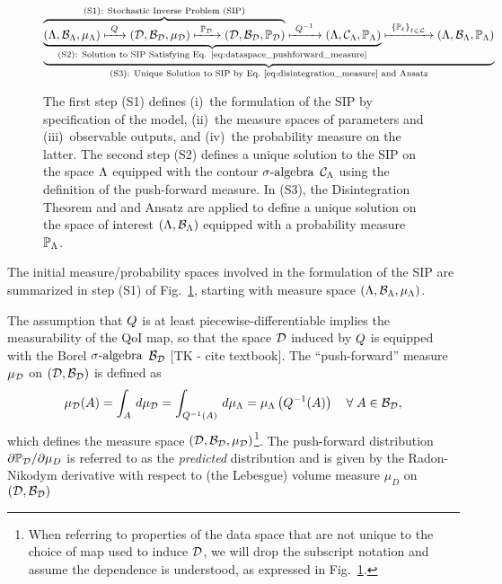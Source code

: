 \begin{figure}[!h]
\begin{equation}
\underbrace{
\underbrace{
\overbrace{ 
 ({\Lambda}, \mathcal{B}_{{\Lambda}}, \mu_{{\Lambda}}) \xmapsto{\  Q \ } (\mathcal{D}, \mathcal{B}_{\mathcal{D}}, \mu_{\mathcal{D}})
  \xmapsto{\ \mathbb{P}_{\mathcal{D}}\ } (\mathcal{D}, \mathcal{B}_{\mathcal{D}}, \mathbb{P}_{\mathcal{D}})
 }^{
 \text{(S1): Stochastic Inverse Problem (SIP)}
 }
 \xmapsto{\ Q^{-1} \ } ({\Lambda}, \mathcal{C}_{\Lambda}, \mathbb{P}_{\Lambda})
 }_{
 \text{(S2): Solution to SIP Satisfying Eq. \eqref{eq:dataspace_pushforward_measure}}} 
 \xmapsto{\ \left\{\mathbb{P}_\ell\right\}_{\ell\in\mathcal{L}} \ } ({\Lambda}, \mathcal{B}_{{\Lambda}}, \mathbb{P}_{\Lambda})
 }
 _{
 \text{(S3): Unique Solution to SIP by Eq.~\eqref{eq:disintegration_measure} and Ansatz}
 }
\end{equation}
\caption{The first step (S1) defines (i)~the formulation of the SIP by specification of the model, (ii)~the measure spaces of parameters and (iii)~observable outputs, and (iv)~the probability measure on the latter. The second step (S2) defines a unique solution to the SIP on the space ${\Lambda}$ equipped with the contour $\sigma\text{-algebra}$ $\mathcal{C}_{\Lambda}$ using the definition of the push-forward measure. In (S3), the Disintegration Theorem and and Ansatz are applied to define a unique solution on the space of interest $({\Lambda}, \mathcal{B}_{{\Lambda}})$ equipped with a probability measure $\mathbb{P}_{\Lambda}$.}
\label{fig:scheme}
\end{figure}


The initial measure/probability spaces involved in the formulation of the SIP are summarized in step (S1) of Fig.~\ref{fig:scheme}, starting with measure space $({\Lambda}, \mathcal{B}_{{\Lambda}}, \mu_{{\Lambda}})$.

The assumption that $Q$ is at least piecewise-differentiable implies the measurability of the QoI map, so that the space $\mathcal{D}$ induced by $Q$ is equipped with the Borel $\sigma\text{-algebra}$ $\mathcal{B}_{\mathcal{D}}$ [TK - cite textbook].
The ``push-forward'' measure $\mu_{\mathcal{D}}$ on ${(\mathcal{D}, \mathcal{B}_{\mathcal{D}})}$ is defined as 
\begin{equation}\label{eq:dataspace_pushforward_measure}
\mu_{\mathcal{D}} (A) = \int_A \, d\mu_{\mathcal{D}} = \int_{Q^{-1}(A)} \, d\mu_{{\Lambda}} = \mu_{{\Lambda}} \left (Q^{-1}(A) \right ) \quad \forall \;  A\in\mathcal{B}_{\mathcal{D}},
\end{equation}
which defines the measure space $(\mathcal{D}, \mathcal{B}_{\mathcal{D}}, \mu_{\mathcal{D}})$\footnote{When referring to properties of the data space that are not unique to the choice of map used to induce $\mathcal{D}$, we will drop the subscript notation and assume the dependence is understood, as expressed in Fig.~\ref{fig:scheme}.}.
The push-forward distribution $\partial \mathbb{P}_{\mathcal{D}} / \partial \mu_D$ is referred to as the \emph{predicted} distribution and is given by the Radon-Nikodym derivative with respect to (the Lebesgue) volume measure $\mu_D$ on ${(\mathcal{D}, \mathcal{B}_{\mathcal{D}})}$ 

